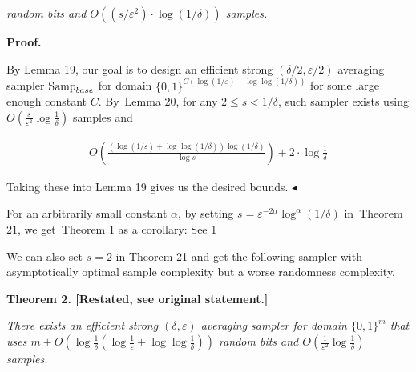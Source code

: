 \documentclass[10pt,a4paper]{article}
\begin{document}
\emph{random bits and $O((s/\varepsilon^{2})\cdot\log(1/\delta))$ samples.}\par







\par\medskip\noindent\textbf{Proof.}\par




By Lemma 19, our goal is to design an efficient strong $(\delta/2,\varepsilon/2)$ averaging sampler $\textup{{Samp}}_{base}$ for domain $\{0,1\}^{C(\log(1/\varepsilon)+\log\log(1/\delta))}$ for some large enough constant $C$. By Lemma 20, for any $2\leq s<1/\delta$, such sampler exists using $O(\frac{s}{\varepsilon^{2}}\log\frac{1}{\delta})$ samples and\par


\[\begin{gathered}
O\left(\frac{(\log(1/\varepsilon)+\log\log(1/\delta))\log(1/\delta)}{\log s}\right)+2\cdot{\log\frac{1}{\delta}}
\end{gathered}\]


Taking these into Lemma 19 gives us the desired bounds.
$\blacktriangleleft$\par




For an arbitrarily small constant $\alpha$, by setting $s=\varepsilon^{-2\alpha}\log^{\alpha}(1/\delta)$ in Theorem 21, we get Theorem 1 as a corollary:
See 1\par




We can also set $s=2$ in Theorem 21 and get the following sampler with asymptotically optimal sample complexity but a worse randomness complexity.\par






\par\medskip\noindent\textbf{
\textbf{Theorem 2}\textbf{.}
[Restated, see original statement.]}\par



\emph{There exists an efficient strong $(\delta,\varepsilon)$ averaging sampler for domain $\{0,1\}^{m}$ that uses $m+O(\log\frac{1}{\delta}(\log\frac{1}{\varepsilon}+\log\log\frac{1}{\delta}))$ random bits and $O(\frac{1}{\varepsilon^{2}}\log\frac{1}{\delta})$ samples.}\par
\end{document}
